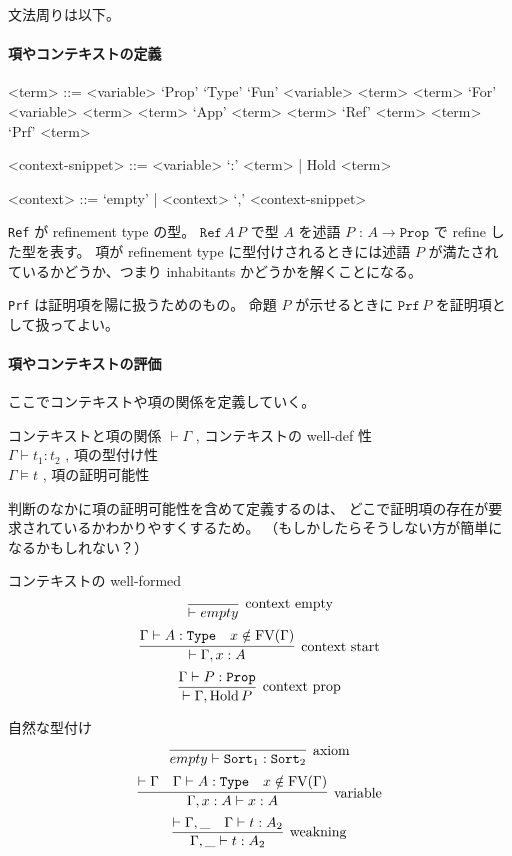 文法周りは以下。

\paragraph*{項やコンテキストの定義}
\begin{grammar}
<term> ::= <variable> 
\alt `Prop'
\alt `Type'
\alt `Fun' <variable> <term> <term>
\alt `For' <variable> <term> <term>
\alt `App' <term> <term>
\alt `Ref' <term> <term>
\alt `Prf' <term>

<context-snippet> ::= <variable> `:' <term> | Hold <term>

<context> ::= `empty' | <context> `,' <context-snippet>
\end{grammar}

\texttt{Ref} が refinement type の型。
\(\texttt{Ref} \, A \, P\) で型 \(A\) を述語 \(P\) : \(A \to \texttt{Prop}\) で refine した型を表す。
項が refinement type に型付けされるときには述語 \(P\) が満たされているかどうか、つまり inhabitants かどうかを解くことになる。

\texttt{Prf} は証明項を陽に扱うためのもの。
命題 \(P\) が示せるときに \(\texttt{Prf} \, P\) を証明項として扱ってよい。

\paragraph*{項やコンテキストの評価}
ここでコンテキストや項の関係を定義していく。

\begin{itembox}[l]{コンテキストと項の関係}
  \(\vdash \Gamma\) , コンテキストの well-def 性 \\
  \(\Gamma \vdash t_1 : t_2\) , 項の型付け性 \\
  \(\Gamma \vDash t\) , 項の証明可能性
\end{itembox}

判断のなかに項の証明可能性を含めて定義するのは、
どこで証明項の存在が要求されているかわかりやすくするため。
（もしかしたらそうしない方が簡単になるかもしれない？）

\begin{itembox}[l]{コンテキストの well-formed}
  \[\infer[\text{context empty}]{\vdash empty}{}\]
  \[\infer[\text{context start}]{\vdash \Gamma , x : A}{\Gamma \vdash A : \texttt{Type} & x \notin \text{FV}(\Gamma)}\]
  \[\infer[\text{context prop}]{\vdash \Gamma , \text{Hold} \, P}{\Gamma \vdash P : \texttt{Prop}}\]
\end{itembox}

\begin{itembox}[l]{自然な型付け}
  \[\infer[\text{axiom}]{empty \vdash \texttt{Sort}_1 : \texttt{Sort}_2}{}\]
  \[\infer[\text{variable}]{\Gamma , x : A \vdash x : A}{\vdash \Gamma & \Gamma \vdash A : \texttt{Type} & x \notin \text{FV}(\Gamma)}\]
  \[\infer[\text{weakning}]{\Gamma , \_ \vdash t : A_2}{\vdash \Gamma , \_ & \Gamma \vdash t : A_2}\]
\end{itembox}

